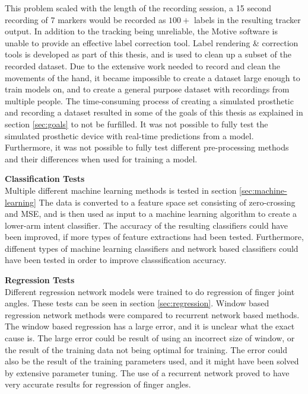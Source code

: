 \documentclass[../main.tex]{subfiles}
\begin{document}
This problem scaled with the length of the recording session, a 15 second recording of 7 markers would be recorded as $100+$ labels in the resulting tracker output.
In addition to the tracking being unreliable, the Motive software is unable to provide an effective label correction tool.
Label rendering \& correction tools is developed as part of this thesis, and is used to clean up a subset of the recorded dataset.
Due to the extensive work needed to record and clean the movements of the hand, it became impossible to create a dataset large enough to train models on, and to create a general purpose dataset with recordings from multiple people. 
The time-consuming process of creating a simulated prosthetic and recording a dataset resulted in some of the goals of this thesis as explained in section \ref{sec:goals} to not be furfilled.
It was not possible to fully test the simulated prosthetic device with real-time predictions from a model. 
Furthermore, it was not possible to fully test different pre-processing methods and their differences when used for training a model.


\textbf{Classification Tests}\\
Multiple different machine learning methods is tested in section  \ref{sec:machine-learning}
The data is converted to a feature space set consisting of zero-crossing and MSE, and is then used as input to a machine learning algorithm to create a lower-arm intent classifier.
The accuracy of the resulting classifiers could have been improved, if more types of feature extractions had been tested.
Furthermore, diffenent types of machine learning classifiers and network based classifiers could have been tested in order to improve classsification accuracy.

\textbf{Regression Tests}\\
Different regression network models were trained to do regression of finger joint angles. These tests can be seen in section \ref{sec:regression}.
Window based regression network methods were compared to recurrent network based methods.
The window based regression has a large error, and it is unclear what the exact cause is.
The large error could be result of using an incorrect size of window, or the result of the training data not being optimal for training.
The error could also be the result of the training parameters used, and it might have been solved by extensive parameter tuning.
The use of a recurrent network proved to have very accurate results for regression of finger angles.
\end{document}
